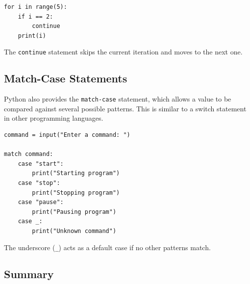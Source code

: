 \begin{verbatim}
for i in range(5):
    if i == 2:
        continue
    print(i)
\end{verbatim}

The \texttt{continue} statement skips the current iteration and moves to the next
one.

\subsection{Match-Case Statements}
Python also provides the \texttt{match-case} statement, which allows a value to be
compared against several possible patterns. This is similar to a switch
statement in other programming languages.

\begin{verbatim}
command = input("Enter a command: ")

match command:
    case "start":
        print("Starting program")
    case "stop":
        print("Stopping program")
    case "pause":
        print("Pausing program")
    case _:
        print("Unknown command")
\end{verbatim}

The underscore (\texttt{\_}) acts as a default case if no other patterns match.

\subsection{Summary}

